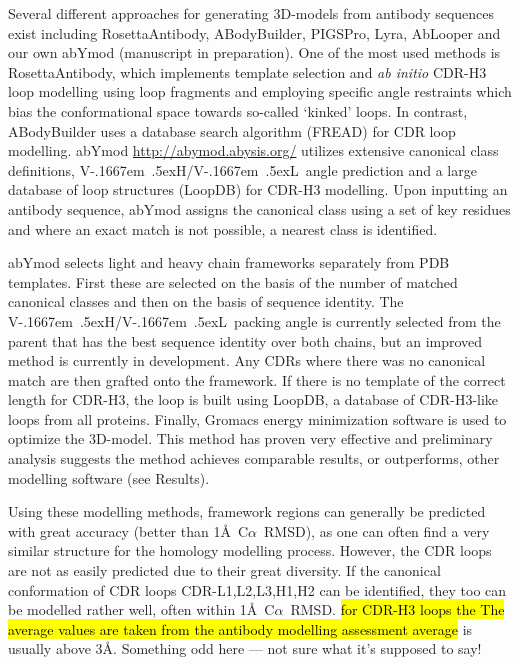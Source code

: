 \documentclass[12pt]{article}
\newcommand{\ca}{\mbox{C$\alpha$}}
\newcommand{\VH}{\mbox{V\kern-.1667em \lower.5ex\hbox{\scriptsize H}}}
\newcommand{\VL}{\mbox{V\kern-.1667em \lower.5ex\hbox{\scriptsize L}}}
\newcommand{\VHVL}{\mbox{\VH/\VL}}
\newcommand{\lilian}[1]{ {\color{red}{\bfseries Lilian:} #1}}
\newcommand{\highlight}[1]{\hl{#1}}
\begin{document}
Several different approaches for generating 
3D-models from antibody sequences exist including
RosettaAntibody\cite{Sircar2009,Sivasubramanian2009}, 
ABodyBuilder\cite{Leem2016}, PIGSPro\cite{Lepore2017}, Lyra\cite{Klausen2015}, AbLooper\cite{Abanades2022} and our own abYmod (manuscript in preparation).
One of the most
used methods is RosettaAntibody, which implements template selection
and \emph{ab initio} CDR-H3 loop modelling using loop fragments and employing
specific angle restraints which bias the conformational space towards
so-called `kinked' loops\cite{Schoeder2021,Weitzner2017}. In
contrast, ABodyBuilder uses a database search algorithm
(FREAD\cite{Choi2010}) for CDR loop modelling.
abYmod \url{http://abymod.abysis.org/} utilizes extensive canonical
class definitions, \VHVL\ angle prediction and a large database of loop
structures (LoopDB) for CDR-H3 modelling.
Upon inputting an antibody sequence, abYmod assigns the
canonical class using a set of key residues\cite{Martin1996} and where
an exact match is not possible, a nearest class is identified.

abYmod selects light and heavy chain frameworks separately from PDB templates.
First these are selected on the basis of the number of matched
canonical classes and then on the basis of sequence identity.  The
\VHVL\ packing angle is currently selected from the parent that has
the best sequence identity over both chains, but an improved method is
currently in development. Any CDRs where there was no canonical match are then
grafted onto the framework. If there is no template of the correct
length for CDR-H3, the loop is built using LoopDB, a database of
CDR-H3-like loops from all proteins. Finally, Gromacs energy
minimization software is used to optimize the 3D-model. This method has
proven very effective and preliminary analysis suggests the method
achieves comparable results, or outperforms, other modelling software
(see Results).

Using these modelling methods, framework regions can
generally be predicted with great accuracy (better than 1\AA\
\ca~RMSD\cite{Almagro2014}), as one can often find a very similar
structure for the homology modelling process.  However, the CDR loops
are not as easily predicted due to their great diversity. If the
canonical conformation of CDR loops CDR-L1,L2,L3,H1,H2 can be identified, they too
can be modelled rather well, often within 1\AA\ \ca~RMSD. \highlight{for CDR-H3 loops
the The average values are taken from the antibody modelling assessment average} is usually above 3\AA\cite{Almagro2011}. \lilian{Something odd here --- not sure what it's supposed to say!}
\end{document}
